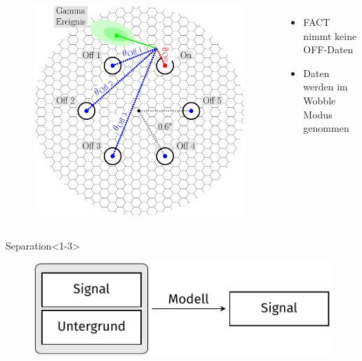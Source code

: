 \documentclass[aspectratio=1610, professionalfonts, 9pt]{beamer}
\begin{document}
\begin{frame}
  \begin{columns}[onlytextwidth]
	\begin{figure}
	  \centering
	  \includegraphics[height=0.8\textheight]{./images/wobble.pdf}
	\end{figure}
	\begin{itemize}
	  \item FACT nimmt keine OFF-Daten
	  \item Daten werden im Wobble Modus genommen
	\end{itemize}
  \end{columns}
\end{frame}

\begin{frame}
  \begin{block}{Separation}<1-3>
	\begin{figure}
	  \centering
	  \includegraphics[scale=0.7]{./tikz/Target/Target.pdf}
	\end{figure}
  \end{block}
\end{frame}
\end{document}
